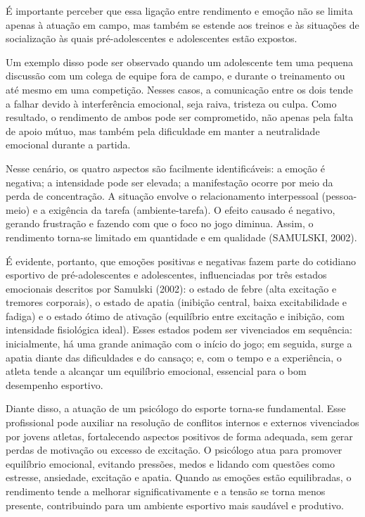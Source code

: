 \begin{Desenvolvimento}
É importante perceber que essa ligação entre rendimento e emoção não se limita apenas à atuação em campo, mas também se estende aos treinos e às situações de socialização às quais pré-adolescentes e adolescentes estão expostos.

Um exemplo disso pode ser observado quando um adolescente tem uma pequena discussão com um colega de equipe fora de campo, e durante o treinamento ou até mesmo em uma competição. Nesses casos, a comunicação entre os dois tende a falhar devido à interferência emocional, seja raiva, tristeza ou culpa. Como resultado, o rendimento de ambos pode ser comprometido, não apenas pela falta de apoio mútuo, mas também pela dificuldade em manter a neutralidade emocional durante a partida.

Nesse cenário, os quatro aspectos são facilmente identificáveis: a emoção é negativa; a intensidade pode ser elevada; a manifestação ocorre por meio da perda de concentração. A situação envolve o relacionamento interpessoal (pessoa-meio) e a exigência da tarefa (ambiente-tarefa). O efeito causado é negativo, gerando frustração e fazendo com que o foco no jogo diminua. Assim, o rendimento torna-se limitado em quantidade e em qualidade (SAMULSKI, 2002).

É evidente, portanto, que emoções positivas e negativas fazem parte do cotidiano esportivo de pré-adolescentes e adolescentes, influenciadas por três estados emocionais descritos por Samulski (2002): o estado de febre (alta excitação e tremores corporais), o estado de apatia (inibição central, baixa excitabilidade e fadiga) e o estado ótimo de ativação (equilíbrio entre excitação e inibição, com intensidade fisiológica ideal). Esses estados podem ser vivenciados em sequência: inicialmente, há uma grande animação com o início do jogo; em seguida, surge a apatia diante das dificuldades e do cansaço; e, com o tempo e a experiência, o atleta tende a alcançar um equilíbrio emocional, essencial para o bom desempenho esportivo.

Diante disso, a atuação de um psicólogo do esporte torna-se fundamental. Esse profissional pode auxiliar na resolução de conflitos internos e externos vivenciados por jovens atletas, fortalecendo aspectos positivos de forma adequada, sem gerar perdas de motivação ou excesso de excitação. O psicólogo atua para promover equilíbrio emocional, evitando pressões, medos e lidando com questões como estresse, ansiedade, excitação e apatia. Quando as emoções estão equilibradas, o rendimento tende a melhorar significativamente e a tensão se torna menos presente, contribuindo para um ambiente esportivo mais saudável e produtivo.


\end{Desenvolvimento}
